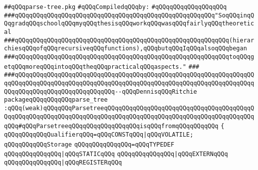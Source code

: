 \label{src/lib/c-kit/src/parser/parse-tree.pkg}
\verb|##qQQqparse-tree.pkg|\newline
\newline
\verb|#qQQqCompiledqQQqby:|\newline
\verb|#qQQqqQQqqQQqqQQqqQQq|\newline
\newline
\verb|###qQQqqQQqqQQqqQQqqQQqqQQqqQQqqQQqqQQqqQQqqQQqqQQqqQQqqQQq"SoqQQqinqQQqgradqQQqschoolqQQqmyqQQqthesisqQQqworkqQQqwasqQQqfairlyqQQqtheoretical|\newline
\verb|###qQQqqQQqqQQqqQQqqQQqqQQqqQQqqQQqqQQqqQQqqQQqqQQqqQQqqQQqqQQq(hierarchiesqQQqofqQQqrecursiveqQQqfunctions),qQQqbutqQQqIqQQqalsoqQQqbegan|\newline
\verb|###qQQqqQQqqQQqqQQqqQQqqQQqqQQqqQQqqQQqqQQqqQQqqQQqqQQqqQQqqQQqtoqQQqgetqQQqmoreqQQqintoqQQqtheqQQqpracticalqQQqaspects."|\newline
\verb|###|\newline
\verb|###qQQqqQQqqQQqqQQqqQQqqQQqqQQqqQQqqQQqqQQqqQQqqQQqqQQqqQQqqQQqqQQqqQQqqQQqqQQqqQQqqQQqqQQqqQQqqQQqqQQqqQQqqQQqqQQqqQQqqQQqqQQqqQQqqQQqqQQqqQQqqQQqqQQqqQQqqQQqqQQqqQQqqQQq--qQQqDennisqQQqRitchie|\newline
\newline
\newline
\newline
\verb|packageqQQqqQQqqQQqparse_tree|\newline
\verb|:qQQq(weak)qQQqqQQqParsetreeqQQqqQQqqQQqqQQqqQQqqQQqqQQqqQQqqQQqqQQqqQQqqQQqqQQqqQQqqQQqqQQqqQQqqQQqqQQqqQQqqQQqqQQqqQQqqQQqqQQqqQQqqQQqqQQqqQQq#qQQqParsetreeqQQqqQQqqQQqqQQqqQQqisqQQqfromqQQqqQQqqQQq|\newline
\verb|{|\newline
\verb|qQQqqQQqqQQqQualifierqQQq=qQQqCONSTqQQq|\verb#|qQQqVOLATILE;#\newline
\newline
\verb|qQQqqQQqqQQqStorage|\newline
\verb|qQQqqQQqqQQqqQQq=qQQqTYPEDEF|\newline
\verb|qQQqqQQqqQQqqQQq|\verb#|qQQqSTATICqQQq#\newline
\verb|qQQqqQQqqQQqqQQq|\verb#|qQQqEXTERNqQQq#\newline
\verb|qQQqqQQqqQQqqQQq|\verb#|qQQqREGISTERqQQq#\newline
